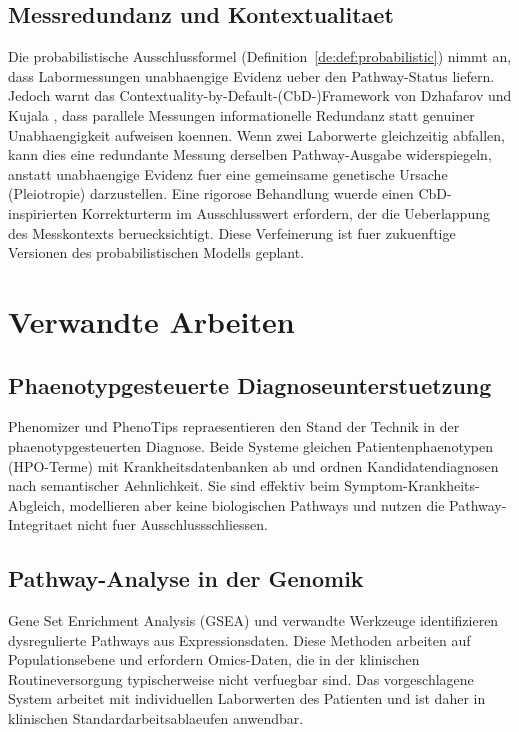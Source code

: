 \documentclass[12pt,a4paper]{article}
\begin{document}
\subsection*{Messredundanz und Kontextualitaet}

Die probabilistische Ausschlussformel (Definition~\ref{de:def:probabilistic}) nimmt an, dass Labormessungen unabhaengige Evidenz ueber den Pathway-Status liefern. Jedoch warnt das Contextuality-by-Default-(CbD-)Framework von Dzhafarov und Kujala \citep{Dzhafarov2016}, dass parallele Messungen informationelle Redundanz statt genuiner Unabhaengigkeit aufweisen koennen. Wenn zwei Laborwerte gleichzeitig abfallen, kann dies eine redundante Messung derselben Pathway-Ausgabe widerspiegeln, anstatt unabhaengige Evidenz fuer eine gemeinsame genetische Ursache (Pleiotropie) darzustellen. Eine rigorose Behandlung wuerde einen CbD-inspirierten Korrekturterm im Ausschlusswert erfordern, der die Ueberlappung des Messkontexts beruecksichtigt. Diese Verfeinerung ist fuer zukuenftige Versionen des probabilistischen Modells geplant.

\section*{Verwandte Arbeiten}
\label{de:sec:related}

\subsection*{Phaenotypgesteuerte Diagnoseunterstuetzung}

Phenomizer \citep{Kohler2009} und PhenoTips \citep{Girdea2013} repraesentieren den Stand der Technik in der phaenotypgesteuerten Diagnose. Beide Systeme gleichen Patientenphaenotypen (HPO-Terme) mit Krankheitsdatenbanken ab und ordnen Kandidatendiagnosen nach semantischer Aehnlichkeit. Sie sind effektiv beim Symptom-Krankheits-Abgleich, modellieren aber keine biologischen Pathways und nutzen die Pathway-Integritaet nicht fuer Ausschlussschliessen.

\subsection*{Pathway-Analyse in der Genomik}

Gene Set Enrichment Analysis (GSEA) \citep{Subramanian2005} und verwandte Werkzeuge identifizieren dysregulierte Pathways aus Expressionsdaten. Diese Methoden arbeiten auf Populationsebene und erfordern Omics-Daten, die in der klinischen Routineversorgung typischerweise nicht verfuegbar sind. Das vorgeschlagene System arbeitet mit individuellen Laborwerten des Patienten und ist daher in klinischen Standardarbeitsablaeufen anwendbar.
\end{document}
